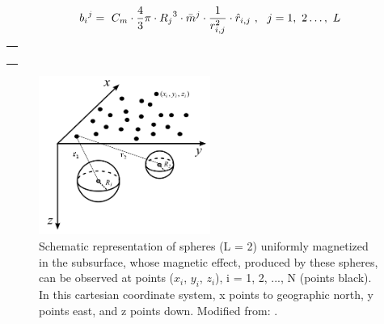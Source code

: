 \documentclass[manuscript,revised]{geophysics}
\begin{document}

\begin{equation} \label{eq:sphere2}
\centering
{b_i}^j=\ C_m \cdot \frac{4}{3}\pi \cdot {R_j}^3 \cdot {\bar{m}}^j\cdot\frac{1}{r_{i,j}^2}\cdot{\hat{r}}_{i,j}\ ,\ \ j=1,\ 2\ldots,\ L
\end{equation}

\begin{tabular}{ l }
\noindent{Where: $C_m=\ \frac{\mu_0}{4\pi}=\ {10}^{-7}\frac{\ H}{m}$; $R_j$ is the radius of the j-th sphere; $r_{i,j}$ is the distance}   \\ 
\noindent{(unit vector ${\hat{r}}_{i,j}$) between the center of the j-th sphere and the observation point i,}    \\  
\noindent{i = 1, 2, . .. N; and ${\bar{m}}^j=\left[{mx}_j\ {my}_j\ {mz}_j\right]^T$ is the vector formed by the cartesian} \\
\noindent{components of the magnetization of the j-th sphere (unit vector ${\hat{m}}^j)$.}
\end{tabular}

\bigskip

\begin{figure}[htbp]
\centering
\includegraphics[width=0.5\textwidth]{MODEL.png}
\caption{Schematic representation of spheres (L = 2) uniformly magnetized in the subsurface, whose magnetic effect, produced by these spheres, can be observed at points ($x_i$, $ y_i$, $z_i$), i = 1, 2, ..., N (points black). In this cartesian coordinate system, x points to geographic north, y points east, and z points down. Modified from: \cite{OliveiraJr.2015}.}
\label{fig:MODEL}
\end{figure}

\end{document}
